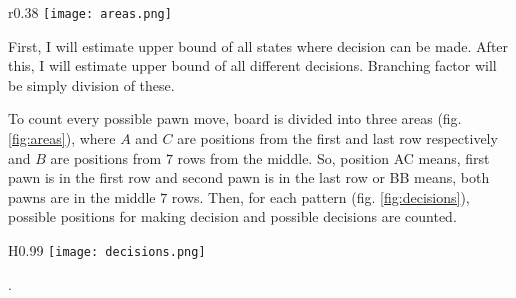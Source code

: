 \begin{wrapfigure}{r}{0.38\textwidth}
  \vspace*{-0.45cm}
  \centering
  \texttt{[image: areas.png]}
  \vspace*{-0.60cm}
  \caption{board areas}
  \label{fig:areas}
  \vspace*{-0.60cm}
\end{wrapfigure}

First, I will estimate upper bound of all states where decision can be made.
After this, I will estimate upper bound of all different decisions.
Branching factor will be simply division of these.

To count every possible pawn move, board is divided into three areas
(fig. \ref{fig:areas}), where $A$ and $C$ are positions from the first
and last row respectively and $B$ are positions from $7$ rows from the middle.
So, position AC means, first pawn is in the first row and second pawn is
in the last row or BB means, both pawns are in the middle $7$ rows. Then, for
each pattern (fig. \ref{fig:decisions}), possible positions for making
decision and possible decisions are counted.

\begin{wrapfigure}{H}{0.99\textwidth}
  \vspace*{-12.40cm}
  \centering
  \texttt{[image: decisions.png]}
  \vspace*{-0.25cm}
  \caption{decission patterns}
  \label{fig:decisions}
  \vspace*{-0.60cm}
\end{wrapfigure}

\vspace{11.70cm}
.

